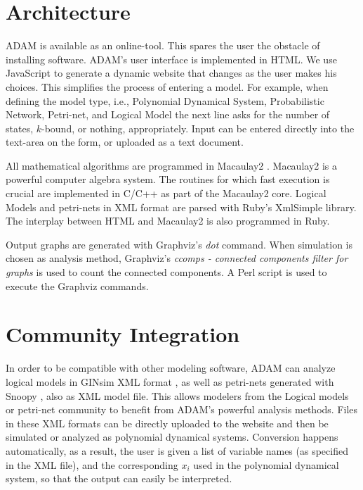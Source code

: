 \documentclass[11pt]{amsart}
\begin{document}
 
\section{Architecture}
ADAM is available as an online-tool. This spares the user the obstacle of installing software. ADAM's user interface is implemented in HTML. We use JavaScript to generate a dynamic website that changes as the user makes his choices. This simplifies the process of entering a model. For example, when defining the model type, i.e., Polynomial Dynamical System, Probabilistic Network, Petri-net, and Logical Model the next line asks for the number of states, $k$-bound, or nothing, appropriately. Input can be entered directly into the text-area on the form, or uploaded as a text document.
 
All mathematical algorithms are programmed in Macaulay2 \cite{M2}. Macaulay2 is a powerful computer algebra system. The routines for which fast execution is crucial are implemented in C/C++ as part of the Macaulay2 core.
Logical Models and petri-nets in XML format are parsed with Ruby's XmlSimple library. The interplay between HTML and Macaulay2 is also programmed in Ruby.
 
Output graphs are generated with Graphviz's {\it dot} command. When simulation is chosen as analysis method, Graphviz's {\it ccomps - connected components filter for graphs} is used to count the connected components. A Perl script is used to execute the Graphviz commands.
 
\section{Community Integration}
In order to be compatible with other modeling software, ADAM can analyze logical models in GINsim XML format \cite{GINsim}, as well as petri-nets generated with Snoopy \cite{Snoopy}, also as XML model file. This allows modelers from the Logical models or petri-net community to benefit from ADAM's powerful analysis methods. Files in these XML formats can be directly uploaded to the website and then be simulated or analyzed as polynomial dynamical systems. Conversion happens automatically, as a result, the user is given a list of variable names (as specified in the XML file), and the corresponding $x_i$ used in the polynomial dynamical system, so that the output can easily be interpreted.
 
\end{document}
